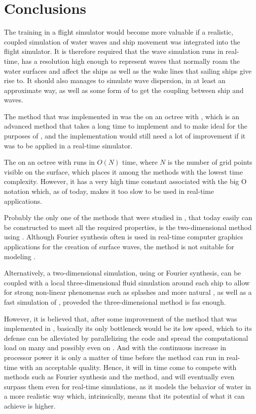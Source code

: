 \chapter{Conclusions}

The training in a flight simulator would become more valuable if a realistic, coupled simulation of water waves and ship movement was integrated into the flight simulator. It is therefore required that the wave simulation runs in real-time, has a resolution high enough to represent waves that normally roam the water surfaces and affect the ships as well as the wake lines that sailing ships give rise to. It should also manages to simulate wave dispersion, in at least an approximate way, as well as some form of \FSI to get the coupling between ship and waves.

The method that was implemented in \thisprojectwork was the \FVM on an octree with \FSM, which is an advanced method that takes a long time to implement and to make ideal for the purposes of \thismasterthesiswork {}\nspace, and the implementation would still need a lot of improvement if it was to be applied in a real-time simulator.

The \FVM on an octree with \FSM runs in $O(N)$ time, where $N$ is the number of grid points visible on the surface, which places it among the methods with the lowest time complexity. However, it has a very high time constant associated with the big O notation which, as of today, makes it too slow to be used in real-time applications.

Probably the only one of the methods that were studied in \thismasterthesiswork, that today easily can be constructed to meet all the required properties, is the two-dimensional method using \LPD. Although Fourier synthesis often is used in real-time computer graphics applications for the creation of surface waves, the method is not suitable for modeling \FSI.

Alternatively, a two-dimensional simulation, using \LPD or Fourier synthesis, can be coupled with a local three-dimensional fluid simulation around each ship to allow for strong non-linear phenomenas such as splashes and more natural \FSI, as well as a fast simulation of , proveded the three-dimensional method is fas enough.

However, it is believed that, after some improvement of the method that was implemented in \thisprojectwork, basically its only bottleneck would be its low speed, which to its defense can be alleviated by parallelizing the code and spread the computational load on many \CPUs and possibly even on \GPUs. And with the continuous increase in processor power it is only a matter of time before the method can run in real-time with an acceptable quality. Hence, it will in time come to compete with methods such as Fourier synthesis and the \LPD method, and will eventually even surpass them even for real-time simulations, as it models the behavior of water in a more realistic way which, intrinsically,  means that its potential of what it can achieve is higher.